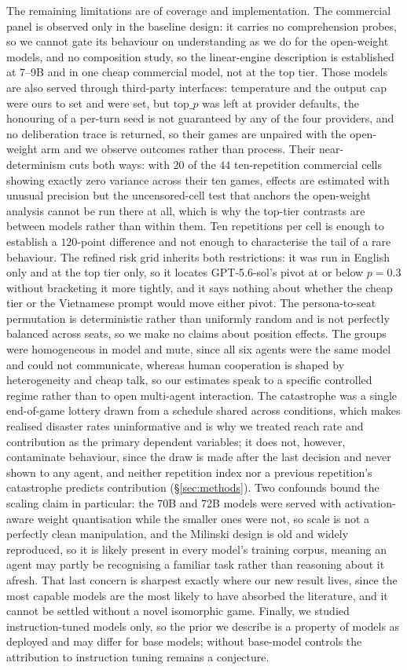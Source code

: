 \documentclass[openacc]{rsproca_new}
\begin{document}
The remaining limitations are of coverage and implementation. The commercial panel is observed only in the baseline design: it carries no comprehension probes, so we cannot gate its behaviour on understanding as we do for the open-weight models, and no composition study, so the linear-engine description is established at 7--9B and in one cheap commercial model, not at the top tier. Those models are also served through third-party interfaces: temperature and the output cap were ours to set and were set, but $\mathrm{top}\_p$ was left at provider defaults, the honouring of a per-turn seed is not guaranteed by any of the four providers, and no deliberation trace is returned, so their games are unpaired with the open-weight arm and we observe outcomes rather than process. Their near-determinism cuts both ways: with $20$ of the $44$ ten-repetition commercial cells showing exactly zero variance across their ten games, effects are estimated with unusual precision but the uncensored-cell test that anchors the open-weight analysis cannot be run there at all, which is why the top-tier contrasts are between models rather than within them. Ten repetitions per cell is enough to establish a $120$-point difference and not enough to characterise the tail of a rare behaviour. The refined risk grid inherits both restrictions: it was run in English only and at the top tier only, so it locates GPT-5.6-sol's pivot at or below $p=0.3$ without bracketing it more tightly, and it says nothing about whether the cheap tier or the Vietnamese prompt would move either pivot. The persona-to-seat permutation is deterministic rather than uniformly random and is not perfectly balanced across seats, so we make no claims about position effects. The groups were homogeneous in model and mute, since all six agents were the same model and could not communicate, whereas human cooperation is shaped by heterogeneity and cheap talk, so our estimates speak to a specific controlled regime rather than to open multi-agent interaction. The catastrophe was a single end-of-game lottery drawn from a schedule shared across conditions, which makes realised disaster rates uninformative and is why we treated reach rate and contribution as the primary dependent variables; it does not, however, contaminate behaviour, since the draw is made after the last decision and never shown to any agent, and neither repetition index nor a previous repetition's catastrophe predicts contribution (\S\ref{sec:methods}). Two confounds bound the scaling claim in particular: the 70B and 72B models were served with activation-aware weight quantisation while the smaller ones were not, so scale is not a perfectly clean manipulation, and the Milinski design is old and widely reproduced, so it is likely present in every model's training corpus, meaning an agent may partly be recognising a familiar task rather than reasoning about it afresh. That last concern is sharpest exactly where our new result lives, since the most capable models are the most likely to have absorbed the literature, and it cannot be settled without a novel isomorphic game. Finally, we studied instruction-tuned models only, so the prior we describe is a property of models as deployed and may differ for base models; without base-model controls the attribution to instruction tuning remains a conjecture.
\end{document}
